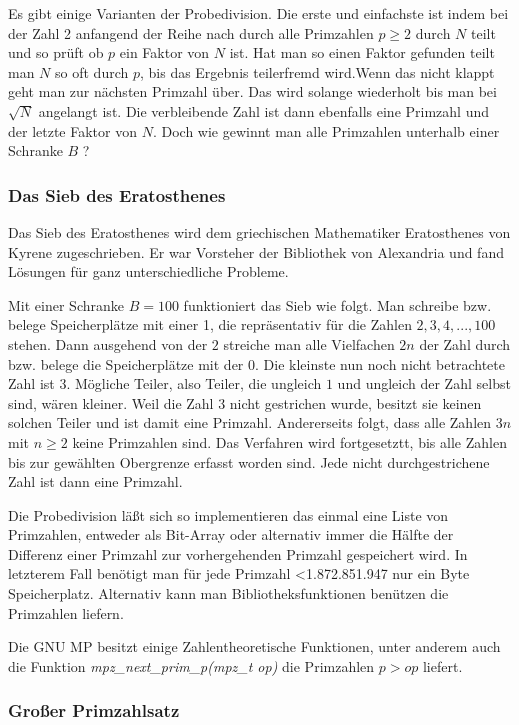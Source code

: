 \documentclass[10pt, bigheadings]{scrartcl}
\begin{document}
Es gibt einige Varianten der Probedivision. Die erste und einfachste
ist indem bei der Zahl 2 anfangend der Reihe nach durch alle Primzahlen
$p\geq 2$ durch $N$ teilt und so prüft ob $p$ ein Faktor von $N$ ist.
Hat man so einen Faktor gefunden teilt man $N$ so oft durch $p$, bis
das Ergebnis teilerfremd wird.Wenn das nicht klappt
geht man zur nächsten Primzahl über. Das wird solange wiederholt bis
man bei $\sqrt{N}$ angelangt ist. Die verbleibende Zahl ist dann
ebenfalls eine Primzahl und der letzte Faktor von $N$. Doch wie gewinnt
man alle Primzahlen unterhalb einer Schranke $B$ ?

\subsubsection*{Das Sieb des Eratosthenes}

Das Sieb des Eratosthenes wird dem griechischen Mathematiker Eratosthenes
von Kyrene zugeschrieben. Er war Vorsteher der Bibliothek von Alexandria
und fand Lösungen für ganz unterschiedliche Probleme.

Mit einer Schranke $B=100$ funktioniert das Sieb wie folgt. Man schreibe
bzw. belege Speicherplätze mit einer 1, die repräsentativ für die Zahlen
$2, 3, 4, ... , 100$ stehen. Dann ausgehend von der $2$ streiche man
alle Vielfachen $2n$ der Zahl durch bzw. belege die Speicherplätze mit
der $0$. Die kleinste nun noch nicht betrachtete Zahl ist $3$. Mögliche
Teiler, also Teiler, die ungleich $1$ und ungleich der Zahl selbst sind,
wären kleiner. Weil die Zahl $3$ nicht gestrichen wurde, besitzt sie
keinen solchen Teiler und ist damit eine Primzahl. Andererseits folgt,
dass alle Zahlen $3n$ mit $n\geq2$ keine Primzahlen sind. Das Verfahren
wird fortgesetztt, bis alle Zahlen bis zur gewählten Obergrenze erfasst
worden sind. Jede nicht durchgestrichene Zahl ist dann eine Primzahl.

Die Probedivision läßt sich so implementieren das einmal eine Liste
von Primzahlen, entweder als Bit-Array oder alternativ immer
die Hälfte der Differenz einer Primzahl zur vorhergehenden Primzahl
gespeichert wird. In letzterem Fall benötigt man für jede
Primzahl <1.872.851.947 nur ein Byte Speicherplatz. Alternativ
kann man Bibliotheksfunktionen benützen die Primzahlen liefern.

Die GNU MP besitzt einige Zahlentheoretische Funktionen, unter anderem
auch die Funktion \textit{mpz\_next\_prim\_p(mpz\_t op)} die
Primzahlen $p > op$ liefert.

\subsubsection*{Großer Primzahlsatz}
\end{document}
